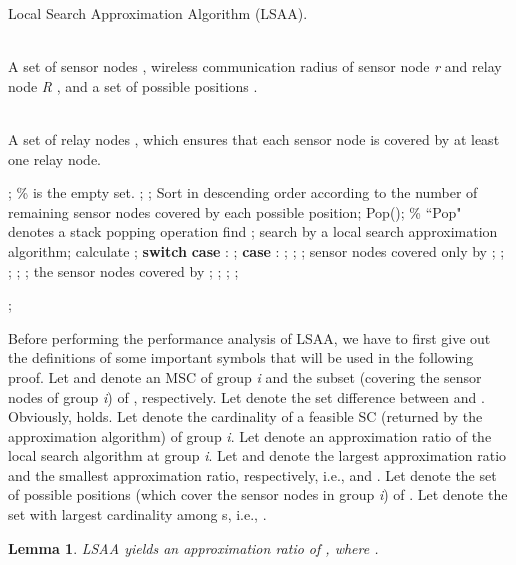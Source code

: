 \documentclass[journal]{IEEEtran}
\newtheorem{lemma}{Lemma}
\begin{document}
\begin{algorithm}[htb]         \caption{Local Search Approximation Algorithm (LSAA).}             
\label{LSAA}                  
\begin{algorithmic}[1]                
\REQUIRE ~~\\                          
   A set of sensor nodes , wireless communication radius of sensor node \emph{r} and relay node \emph{R}  , and a set of possible positions .

\ENSURE ~~\\                           
    A set of relay nodes , which ensures that each sensor node is covered by at least one relay node.

\STATE ; \% is the empty set.
\STATE ;
\STATE ;
\WHILE{}
\STATE Sort  in descending order according to the number of remaining sensor nodes covered by each possible position;
\STATE Pop(); \% ``Pop" denotes a stack popping operation
\STATE find ;
\STATE search  by a local search approximation algorithm;
\STATE calculate ;
\STATE \textbf{switch}
\STATE \quad  \textbf{case} : ;
\STATE \quad  \textbf{case} : ;
\STATE ;
\WHILE{(}
\STATE   ;
\STATE   sensor nodes covered only by ;
\STATE ;
\WHILE{()}
\STATE ;
\ENDIF
\STATE ;
\ENDWHILE
\STATE ;
\ENDWHILE
\STATE the sensor nodes covered by ;
\STATE ;
\STATE ;
\STATE ;
\ENDWHILE

\RETURN ;                
\end{algorithmic}

\end{algorithm}

Before performing the performance analysis of LSAA, we have to first give out the definitions of some important symbols that will be used in the following proof.
 Let  and  denote an MSC of group \emph{i} and the subset (covering the sensor nodes of group \emph{i}) of , respectively. Let  denote the set difference between  and . Obviously,  holds. Let  denote the cardinality of a feasible SC (returned by the approximation algorithm) of group \emph{i}. Let  denote an approximation ratio of the local search algorithm at group \emph{i}. Let  and  denote the largest approximation ratio and the smallest approximation ratio, respectively, i.e.,  and .
Let  denote the set of possible positions (which cover the sensor nodes in group \emph{i}) of .
Let  denote the set with largest cardinality among s, i.e., .

\begin{lemma}\label{lemma1}
 LSAA yields an approximation ratio of , where .
\end{lemma}
\end{document}

